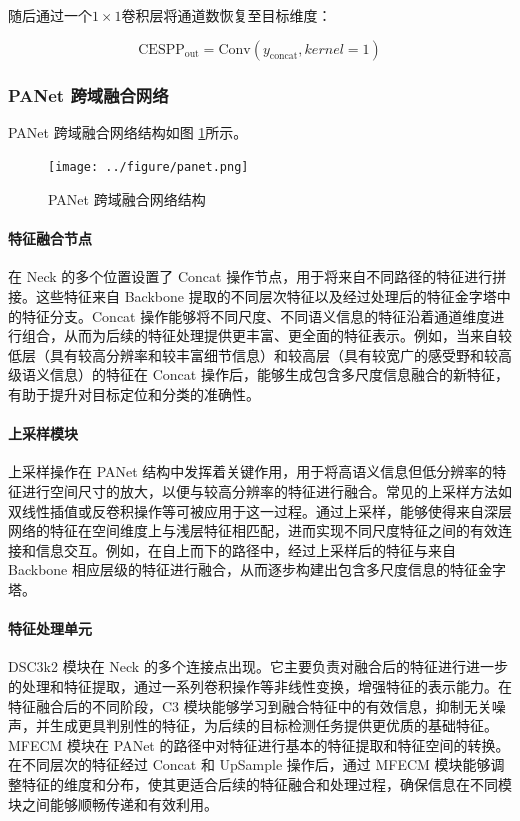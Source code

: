 \documentclass[runningheads]{llncs}
\begin{document}
随后通过一个$1\times1$卷积层将通道数恢复至目标维度：

\begin{equation}
    \text{CESPP}_{\text{out}} = \text{Conv}(y_{\text{concat}}, kernel=1)
\end{equation}

\subsubsection{PANet 跨域融合网络}

PANet 跨域融合网络结构如图 \ref{fig:panet}所示。
\begin{figure}[htbp]
    \centering
    \texttt{[image: ../figure/panet.png]}
    \caption{PANet 跨域融合网络结构}
    \label{fig:panet}
\end{figure}

\paragraph{特征融合节点}

在 Neck 的多个位置设置了 Concat 操作节点，用于将来自不同路径的特征进行拼接。这些特征来自 Backbone 提取的不同层次特征以及经过处理后的特征金字塔中的特征分支。Concat 操作能够将不同尺度、不同语义信息的特征沿着通道维度进行组合，从而为后续的特征处理提供更丰富、更全面的特征表示。例如，当来自较低层（具有较高分辨率和较丰富细节信息）和较高层（具有较宽广的感受野和较高级语义信息）的特征在 Concat 操作后，能够生成包含多尺度信息融合的新特征，有助于提升对目标定位和分类的准确性。

\paragraph{上采样模块}

上采样操作在 PANet 结构中发挥着关键作用，用于将高语义信息但低分辨率的特征进行空间尺寸的放大，以便与较高分辨率的特征进行融合。常见的上采样方法如双线性插值或反卷积操作等可被应用于这一过程。通过上采样，能够使得来自深层网络的特征在空间维度上与浅层特征相匹配，进而实现不同尺度特征之间的有效连接和信息交互。例如，在自上而下的路径中，经过上采样后的特征与来自 Backbone 相应层级的特征进行融合，从而逐步构建出包含多尺度信息的特征金字塔。

\paragraph{特征处理单元}

DSC3k2 模块在 Neck 的多个连接点出现。它主要负责对融合后的特征进行进一步的处理和特征提取，通过一系列卷积操作等非线性变换，增强特征的表示能力。在特征融合后的不同阶段，C3 模块能够学习到融合特征中的有效信息，抑制无关噪声，并生成更具判别性的特征，为后续的目标检测任务提供更优质的基础特征。
MFECM 模块在 PANet 的路径中对特征进行基本的特征提取和特征空间的转换。在不同层次的特征经过 Concat 和 UpSample 操作后，通过 MFECM 模块能够调整特征的维度和分布，使其更适合后续的特征融合和处理过程，确保信息在不同模块之间能够顺畅传递和有效利用。
\end{document}
